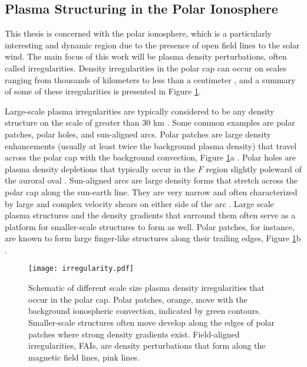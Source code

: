 \subsection{Plasma Structuring in the Polar Ionosphere}
\label{sec:polar_structure}

This thesis is concerned with the polar ionosphere, which is a particularly interesting and dynamic region due to the presence of open field lines to the solar wind.  The main focus of this work will be plasma density perturbations, often called irregularities.  Density irregularities in the polar cap can occur on scales ranging from thousands of kilometers to less than a centimeter \citep{Tsunoda1988}, and a summary of some of these irregularities is presented in Figure \ref{fig:polarirreg}.  

Large-scale plasma irregularities are typically considered to be any density structure on the scale of greater than 30 km \citep{Kelley2009}.  Some common examples are polar patches, polar holes, and sun-aligned arcs.  Polar patches are large density enhancements (usually at least twice the background plasma density) that travel across the polar cap with the background convection, Figure \ref{fig:polarirreg}a \citep{Weber1984,Valladares1994}.  Polar holes are plasma density depletions that typically occur in the \(F\) region slightly poleward of the auroral oval \citep{Benson2001}.  Sun-aligned arcs are large density forms that stretch across the polar cap along the sun-earth line.  They are very narrow and often characterized by large and complex velocity shears on either side of the arc \citep{Valladares1991}.  Large scale plasma structures and the density gradients that surround them often serve as a platform for smaller-scale structures to form as well.  Polar patches, for instance, are known to form large finger-like structures along their trailing edges, Figure \ref{fig:polarirreg}b \citep{Gondarenko2004b,Hosokawa2016}.

\begin{figure}
	\texttt{[image: irregularity.pdf]}
	\caption[Plasma irregularities in the polar ionosphere]{Schematic of different scale size plasma density irregularities that occur in the polar cap.  Polar patches, orange, move with the background ionospheric convection, indicated by green contours.  Smaller-scale structures often move develop along the edges of polar patches where strong density gradients exist.  Field-aligned irregularities, FAIs, are density perturbations that form along the magnetic field lines, pink lines.}
	\label{fig:polarirreg}
\end{figure}

